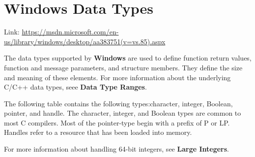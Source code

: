 	\chapter{Windows Data Types}
	
	Link: \url{https://msdn.microsoft.com/en-us/library/windows/desktop/aa383751(v=vs.85).aspx}	
	
	The data types supported by \textbf{Windows} are used to define function return values, function and message parameters, and structure members. They define the size and meaning of these elements. For more information about the underlying C/C++ data types, seee \textbf{Data Type Ranges}.
	
	The following table contains the following types:character, integer, Boolean, pointer, and handle. The character, integer, and Boolean types are common to most C compilers. Most of the pointer-type begin with a prefix of P or LP. Handles refer to a resource that has been loaded into memory.
	
	For more information about handling 64-bit integers, see \textbf{Large Integers}.
	
